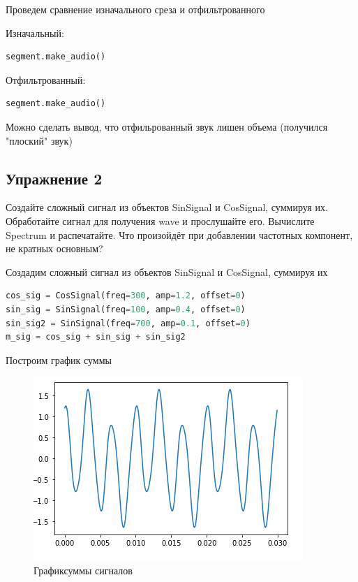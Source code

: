 Проведем сравнение изначального среза и отфильтрованного

Изначальный:
\begin{lstlisting}[language=Python]
segment.make_audio()
\end{lstlisting}

Отфильтрованный:
\begin{lstlisting}[language=Python]
segment.make_audio()
\end{lstlisting}

Можно сделать вывод, что отфильрованный звук лишен объема (получился "плоский" звук)


\subsection{Упражнение 2}

Создайте сложный сигнал из объектов SinSignal и CosSignal, суммируя их. Обработайте сигнал для получения wave и прослушайте его. Вычислите Spectrum и распечатайте. Что произойдёт при добавлении частотных компонент, не кратных основным?

Создадим сложный сигнал из объектов SinSignal и CosSignal, суммируя их
\begin{lstlisting}[language=Python]
cos_sig = CosSignal(freq=300, amp=1.2, offset=0)
sin_sig = SinSignal(freq=100, amp=0.4, offset=0)
sin_sig2 = SinSignal(freq=700, amp=0.1, offset=0)
m_sig = cos_sig + sin_sig + sin_sig2
\end{lstlisting}

Построим график суммы
\begin{figure}[H]
	\begin{center}
		\includegraphics[scale=1]{fig/lab01/lab01_08.png}
		\caption{Графиксуммы сигналов}
	\end{center}
\end{figure}

